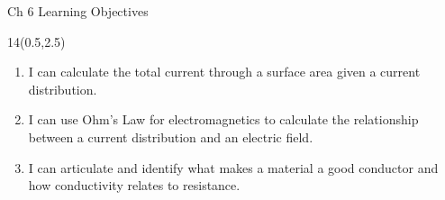 \def\obja{I can calculate the total current through a surface area given a current distribution. }
\def\objb{  I can use Ohm's Law for electromagnetics to calculate the relationship between a current distribution and an electric field. }
\def\objc{ I can articulate and identify what makes a material a good conductor and how conductivity relates to resistance.}
\begin{frame}{Ch 6 Learning Objectives}
	\begin{textblock}{14}(0.5,2.5)
	\begin{myblock}[0.95]{}
	\begin{small}
	\begin{enumerate}[{6}.1]

		\item \alert{ \obja }
		\item \alert{ \objb }
		\item \alert{ \objc }
		
	\end{enumerate}
	\end{small}
	\end{myblock}
	\end{textblock}
\end{frame}